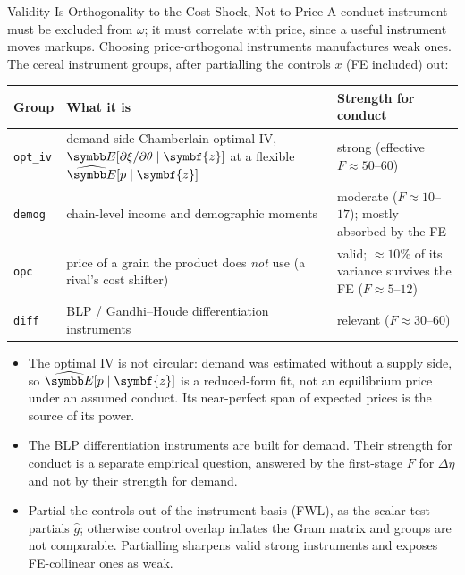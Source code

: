 \documentclass[aspectratio=169,10pt]{beamer}
\begin{document}
\begin{frame}{Validity Is Orthogonality to the Cost Shock, Not to Price}
\footnotesize
A conduct instrument must be excluded from $\omega$; it \alert{must} correlate with price, since a useful instrument moves markups. Choosing price-orthogonal instruments manufactures weak ones. The cereal instrument groups, after partialling the controls $x$ (FE included) out:
\begin{center}
\renewcommand{\arraystretch}{1.15}
\scriptsize
\begin{tabular}{lp{5.6cm}p{5.2cm}}
\toprule
Group & What it is & Strength for conduct \\
\midrule
\texttt{opt\_iv} & demand-side Chamberlain optimal IV, $\E[\partial\xi/\partial\theta \mid \symbf{z}]$ at a flexible $\widehat{\E}[p \mid \symbf{z}]$ & \alert{strong} (effective $F \approx 50$--$60$) \\
\texttt{demog} & chain-level income and demographic moments & moderate ($F \approx 10$--$17$); mostly absorbed by the FE \\
\texttt{opc} & price of a grain the product does \emph{not} use (a rival's cost shifter) & valid; $\approx 10\%$ of its variance survives the FE ($F \approx 5$--$12$) \\
\texttt{diff} & BLP / Gandhi--Houde differentiation instruments & relevant ($F \approx 30$--$60$) \\
\bottomrule
\end{tabular}
\end{center}
\begin{itemize}
\item The optimal IV is not circular: demand was estimated \alert{without} a supply side, so $\widehat{\E}[p \mid \symbf{z}]$ is a reduced-form fit, not an equilibrium price under an assumed conduct. Its near-perfect span of expected prices is the source of its power.
\item The BLP differentiation instruments are built for demand. Their strength for conduct is a separate empirical question, answered by the first-stage $F$ for $\Delta\eta$ and not by their strength for demand.
\item Partial the controls out of the instrument basis (FWL), as the scalar test partials $\widehat{g}$; otherwise control overlap inflates the Gram matrix and groups are not comparable. Partialling \alert{sharpens} valid strong instruments and exposes FE-collinear ones as weak.
\end{itemize}
\end{frame}
\end{document}
